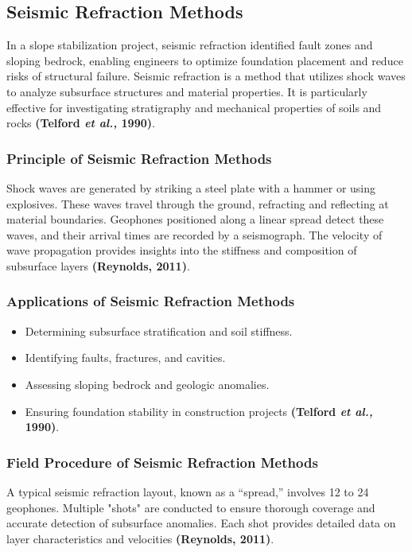 \documentclass[12pt,a4paper]{report}
\begin{document}
\subsection{Seismic Refraction Methods}
In a slope stabilization project, seismic refraction identified fault zones and sloping bedrock, enabling engineers to optimize foundation placement and reduce risks of structural failure. Seismic refraction is a method that utilizes shock waves to analyze subsurface structures and material properties. It is particularly effective for investigating stratigraphy and mechanical properties of soils and rocks \textbf{(Telford \textit{et al.,} 1990)}.

\subsubsection{Principle of Seismic Refraction Methods}
Shock waves are generated by striking a steel plate with a hammer or using explosives. These waves travel through the ground, refracting and reflecting at material boundaries. Geophones positioned along a linear spread detect these waves, and their arrival times are recorded by a seismograph. The velocity of wave propagation provides insights into the stiffness and composition of subsurface layers \textbf{(Reynolds, 2011)}.

\subsubsection{Applications of Seismic Refraction Methods}
\begin{itemize}
    \item Determining subsurface stratification and soil stiffness.
    \item Identifying faults, fractures, and cavities.
    \item Assessing sloping bedrock and geologic anomalies.
    \item Ensuring foundation stability in construction projects \textbf{(Telford \textit{et al.,} 1990)}.
\end{itemize}

\subsubsection{Field Procedure of Seismic Refraction Methods}
A typical seismic refraction layout, known as a “spread,” involves 12 to 24 geophones. Multiple "shots" are conducted to ensure thorough coverage and accurate detection of subsurface anomalies. Each shot provides detailed data on layer characteristics and velocities \textbf{(Reynolds, 2011)}.
\end{document}
